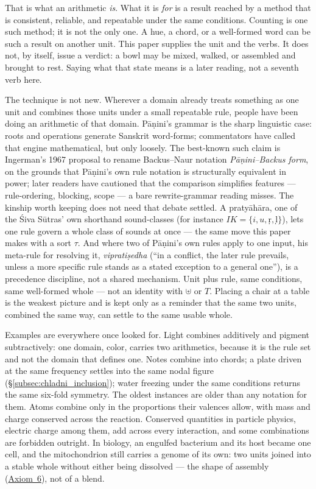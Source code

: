 \documentclass[12pt, a4paper]{article}
\begin{document}
That is what an arithmetic \emph{is}. What it is \emph{for} is a
result reached by a method that is consistent, reliable, and
repeatable under the same conditions. Counting is one such method; it
is not the only one. A hue, a chord, or a well-formed word can be
such a result on another unit. This paper supplies the unit and the
verbs. It does not, by itself, issue a verdict: a bowl may be mixed,
walked, or assembled and brought to rest. Saying what that state
means is a later reading, not a seventh verb here.

The technique is not new. Wherever a domain already treats something
as one unit and combines those units under a small repeatable rule,
people have been doing an arithmetic of that domain. Pāṇini's grammar
is the sharp linguistic case: roots and operations generate Sanskrit
word-forms; commentators have called that engine mathematical, but
only loosely. The best-known such claim is Ingerman's 1967 proposal
to rename Backus--Naur notation \emph{Pāṇini--Backus form}, on the
grounds that Pāṇini's own rule notation is structurally equivalent in
power; later readers have cautioned that the comparison simplifies
features --- rule-ordering, blocking, scope --- a bare rewrite-grammar
reading misses. The kinship worth keeping does not need that debate
settled. A pratyāhāra, one of the Śiva Sūtras' own shorthand
sound-classes (for instance $IK=\{i,u,ṛ,ḷ\}$), lets one rule govern a
whole class of sounds at once --- the same move this paper makes with
a sort $\tau$. And where two of Pāṇini's own rules apply to one
input, his meta-rule for resolving it, \emph{vipratiṣedha} (``in a
conflict, the later rule prevails, unless a more specific rule stands
as a stated exception to a general one''), is a precedence
discipline, not a shared mechanism. Unit plus rule, same conditions,
same well-formed whole --- not an identity with $\uplus$ or $T$.
Placing a chair at a table is the weakest picture and is kept
only as a reminder that the same two units, combined the same way,
can settle to the same usable whole.

Examples are everywhere once looked for. Light combines additively
and pigment subtractively: one domain, color, carries two
arithmetics, because it is the rule set and not the domain that
defines one. Notes combine into chords; a plate driven at the same
frequency settles into the same nodal figure
(\S\ref{subsec:chladni_inclusion}); water freezing under the same
conditions returns the same six-fold symmetry. The oldest instances
are older than any notation for them. Atoms combine only in the
proportions their valences allow, with mass and charge conserved
across the reaction. Conserved quantities in particle physics,
electric charge among them, add across every interaction, and some
combinations are forbidden outright. In biology, an engulfed
bacterium and its host became one cell, and the mitochondrion still
carries a genome of its own: two units joined into a stable whole
without either being dissolved --- the shape of assembly
(\hyperref[subsec:axiom_assembly]{Axiom~6}), not of a blend.
\end{document}
